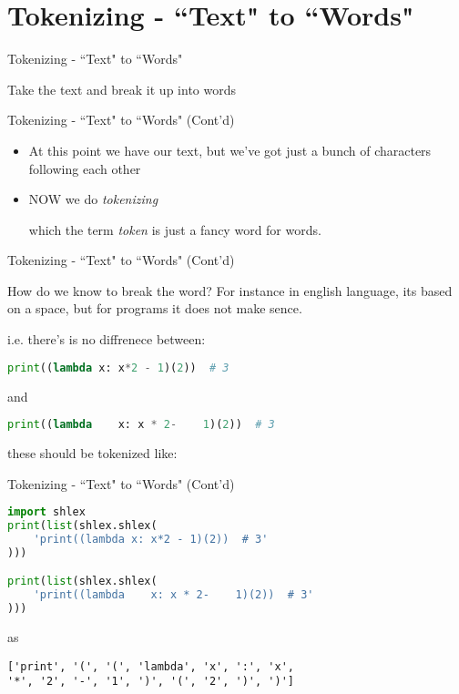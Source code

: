 \section{Tokenizing - ``Text" to ``Words"}
\begin{frame}{Tokenizing - ``Text" to ``Words"}
\begin{itemize}
{\LARGE \item[-] Take the text and break it up into words}
\end{itemize}
\end{frame}

\begin{frame}{Tokenizing - ``Text" to ``Words" (Cont'd)}
\begin{itemize}
\item[-]<1>
At this point we have our text, but we’ve got just a bunch of characters following each other

\item[-]<2> NOW we do \textit{tokenizing}

which the term \textit{token} is just a fancy word for words.
\end{itemize}
\end{frame}

\begin{frame}[fragile]{Tokenizing - ``Text" to ``Words" (Cont'd)}
\begin{flushleft}
How do we know to break the word? For instance in english language, its based on a space, but for programs it
does not make sence. 

i.e. there's is no diffrenece between:
\begin{lstlisting}[language=python, keywordstyle=\color{Mulberry}\textbf]
print((lambda x: x*2 - 1)(2))  # 3
\end{lstlisting}
and
\begin{lstlisting}[language=python, keywordstyle=\color{Mulberry}\textbf]
print((lambda    x: x * 2-    1)(2))  # 3
\end{lstlisting}
these should be tokenized like:
\end{flushleft}
\end{frame}

\begin{frame}[fragile]{Tokenizing - ``Text" to ``Words" (Cont'd)}
\begin{flushleft}
\begin{lstlisting}[language=python, keywordstyle=\color{Mulberry}\textbf]
import shlex
print(list(shlex.shlex(
    'print((lambda x: x*2 - 1)(2))  # 3'
)))

print(list(shlex.shlex(
    'print((lambda    x: x * 2-    1)(2))  # 3'
)))
\end{lstlisting}
as
\begin{lstlisting}
['print', '(', '(', 'lambda', 'x', ':', 'x',
'*', '2', '-', '1', ')', '(', '2', ')', ')']
\end{lstlisting}
\end{flushleft}
\end{frame}
